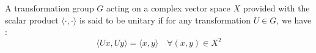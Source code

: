 \documentclass[a4paper,10pt]{article}
\begin{document}

\begin{definition}
    A transformation group $G$ acting on a complex vector space $X$ provided with the scalar product $\langle \cdot,\cdot \rangle$ is said to be unitary if for any transformation $U \in G$, we have :
    \begin{equation*}
        \langle Ux,Uy\rangle = \langle x,y\rangle \quad\forall(x,y) \in X^2
    \end{equation*}
\end{definition}


\end{document}
